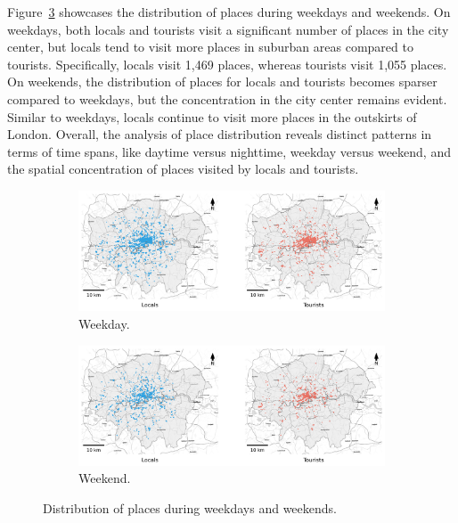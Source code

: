\documentclass{article}
\theoremstyle{definition}
\theoremstyle{remark}
\begin{document}
Figure~\ref{fig:places_distribution_week} showcases the distribution of places during weekdays and weekends. On weekdays, both locals and tourists visit a significant number of places in the city center, but locals tend to visit more places in suburban areas compared to tourists. Specifically, locals visit 1,469 places, whereas tourists visit 1,055 places. On weekends, the distribution of places for locals and tourists becomes sparser compared to weekdays, but the concentration in the city center remains evident. Similar to weekdays, locals continue to visit more places in the outskirts of London. Overall, the analysis of place distribution reveals distinct patterns in terms of time spans, like daytime versus nighttime, weekday versus weekend, and the spatial concentration of places visited by locals and tourists.


\begin{figure}[!h]

\centering
\begin{subfigure}{0.6\textheight}
\centering
\includegraphics[width=0.9\linewidth]{figures/places_weekday.png}
\caption{Weekday.}
\label{fig:places_weekday}
\end{subfigure}
\begin{subfigure}{0.6\textheight}
\centering
\includegraphics[width=0.9\linewidth]{figures/places_weekend.png}
\caption{Weekend.}
\label{fig:places_weekend}
\end{subfigure}

\caption{Distribution of places during weekdays and weekends.}
\label{fig:places_distribution_week}
\end{figure}
\end{document}
